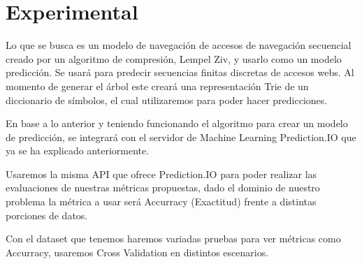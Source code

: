 \chapter[Experimental]{Experimental}





{
}

Lo que se busca es un modelo de navegación de accesos de navegación secuencial creado por un algoritmo de compresión, Lempel Ziv,  y usarlo como un modelo  predicción. Se usará para predecir secuencias finitas discretas de accesos webs. Al momento de generar el árbol este creará una representación Trie de un diccionario de símbolos, el cual utilizaremos para poder hacer predicciones.

En base a lo anterior y teniendo funcionando el algoritmo para crear un modelo de predicción, se integrará con el servidor de Machine Learning Prediction.IO que ya se ha explicado anteriormente.



Usaremos la misma API que ofrece Prediction.IO para poder realizar las evaluaciones de nuestras métricas propuestas, dado el dominio de nuestro problema la métrica a usar será Accurracy (Exactitud) frente a distintas porciones de datos.



Con el dataset que tenemos haremos variadas pruebas para ver métricas como Accurracy, usaremos Cross Validation en distintos escenarios.


